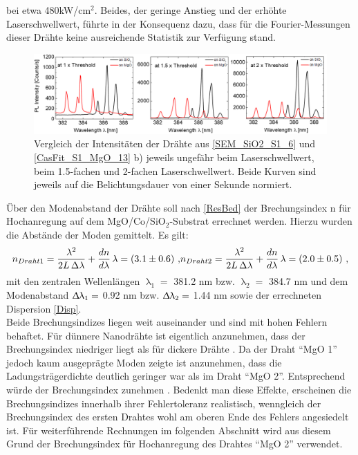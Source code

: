bei etwa 480kW/cm$^\text{2}$. Beides, der geringe Anstieg und der erhöhte
Laserschwellwert, führte in der Konsequenz dazu, dass für die Fourier-Messungen
dieser Drähte keine ausreichende Statistik zur Verfügung stand.\begin{figure}[b]
\centering \includegraphics[width=1\textwidth]{Bilder/MgO/Spec_MgO}
\caption{Vergleich der Intensitäten der Drähte aus \autoref{SEM_SiO2_S1_6} und
\autoref{CasFit_S1_MgO_13} b) jeweils ungefähr beim Laserschwellwert, beim
1.5-fachen und 2-fachen Laserschwellwert. Beide Kurven sind jeweils auf die
Belichtungsdauer von einer Sekunde normiert.} \label{Spec_MgO} \end{figure}Über
den Modenabstand der Drähte soll nach \autoref{ResBed}  der Brechungsindex n für
Hochanregung auf dem MgO/Co/SiO$_\text{2}$-Substrat errechnet werden. Hierzu
wurden die Abstände der Moden gemittelt. Es gilt: \begin{equation} n_{Draht 1}
=\frac{\lambda^2}{2L\, \Delta\lambda} + \frac{dn}{d\lambda}\, \lambda= (3.1 \pm
0.6) \text{ ,}\\ n_{Draht 2} =\frac{\lambda^2}{2L\, \Delta\lambda} +
\frac{dn}{d\lambda}\, \lambda= (2.0 \pm 0.5) \text{ ,} \label{RefIndex}
\end{equation} mit den zentralen Wellenlängen $\uplambda_\text{1}=$ 381.2 nm
bzw. $\uplambda_\text{2}=$ 384.7 nm und dem Modenabstand
$\Updelta\uplambda_\text{1}=$ 0.92 nm bzw. $\Updelta\uplambda_\text{2}=$ 1.44 nm
sowie der errechneten Dispersion \autoref{Disp}.\\ Beide Brechungsindizes liegen
weit auseinander und sind mit hohen Fehlern behaftet. Für dünnere Nanodrähte ist
eigentlich anzunehmen, dass der Brechungsindex niedriger liegt als für dickere
Drähte \cite{Zimmler.2010}. Da der Draht ``MgO 1'' jedoch kaum ausgeprägte Moden
zeigte ist anzunehmen, dass die Ladungsträgerdichte deutlich geringer war als im
Draht ``MgO 2''. Entsprechend würde der Brechungsindex zunehmen
\cite{Wille.2016}. Bedenkt man diese Effekte, erscheinen die Brechungsindizes
innerhalb ihrer Fehlertoleranz realistisch, wenngleich der Brechungsindex des
ersten Drahtes wohl am oberen Ende des Fehlers angesiedelt ist. Für
weiterführende Rechnungen im folgenden Abschnitt wird aus diesem Grund der
Brechungsindex für Hochanregung des Drahtes ``MgO 2''  verwendet.
